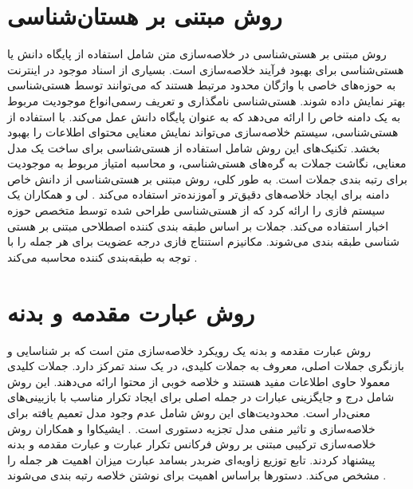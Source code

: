\section{روش مبتنی بر هستان‌شناسی}
روش مبتنی بر هستی‌شناسی در خلاصه‌سازی متن شامل استفاده از پایگاه دانش یا هستی‌شناسی برای بهبود فرآیند خلاصه‌سازی است. بسیاری از اسناد موجود در اینترنت به حوزه‌های خاصی با واژگان محدود مرتبط هستند که می‌توانند توسط هستی‌شناسی بهتر نمایش داده شوند. هستی‌شناسی نامگذاری و تعریف رسمی‌انواع موجودیت مربوط به یک دامنه خاص را ارائه می‌دهد که به عنوان پایگاه دانش عمل می‌کند. با استفاده از هستی‌شناسی، سیستم خلاصه‌سازی می‌تواند نمایش معنایی محتوای اطلاعات را بهبود بخشد. تکنیک‌های این روش شامل استفاده از هستی‌شناسی برای ساخت یک مدل معنایی، نگاشت جملات به گره‌های هستی‌شناسی، و محاسبه امتیاز مربوط به موجودیت برای رتبه بندی جملات است. به طور کلی، روش مبتنی بر هستی‌شناسی از دانش خاص دامنه برای ایجاد خلاصه‌های دقیق‌تر و آموزنده‌تر استفاده می‌کند
\cite{andhale2016overview}.
لی و همکاران  یک سیستم فازی را ارائه کرد که از هستی‌شناسی طراحی شده توسط متخصص حوزه اخبار استفاده می‌کند. جملات بر اساس طبقه بندی کننده اصطلاحی مبتنی بر هستی شناسی طبقه بندی می‌شوند. مکانیزم استنتاج فازی درجه عضویت برای هر جمله را با توجه به طبقه‌بندی کننده محاسبه می‌کند
\cite{lee2005fuzzy}.

\section{روش  عبارت مقدمه و بدنه}

روش عبارت مقدمه و بدنه یک رویکرد خلاصه‌سازی متن است که بر شناسایی و بازنگری جملات اصلی، معروف به جملات کلیدی، در یک سند تمرکز دارد. جملات کلیدی معمولا حاوی اطلاعات مفید هستند و خلاصه خوبی از محتوا ارائه می‌دهند. این روش شامل درج و جایگزینی عبارات در جمله اصلی برای ایجاد تکرار مناسب با بازبینی‌های معنی‌دار است. محدودیت‌های این روش شامل عدم وجود مدل تعمیم یافته برای خلاصه‌سازی و تاثیر منفی مدل تجزیه دستوری است.
\cite{andhale2016overview}.
ایشیکاوا و همکاران  روش خلاصه‌سازی ترکیبی مبتنی بر روش فرکانس تکرار عبارت
 و عبارت مقدمه و بدنه پیشنهاد کردند. تابع توزیع زاویه‌ای ضربدر بسامد عبارت  میزان اهمیت هر جمله را مشخص می‌کند. دستورها براساس اهمیت برای نوشتن خلاصه رتبه بندی می‌شوند
\cite{Ishikawa2001HybridTS}.

